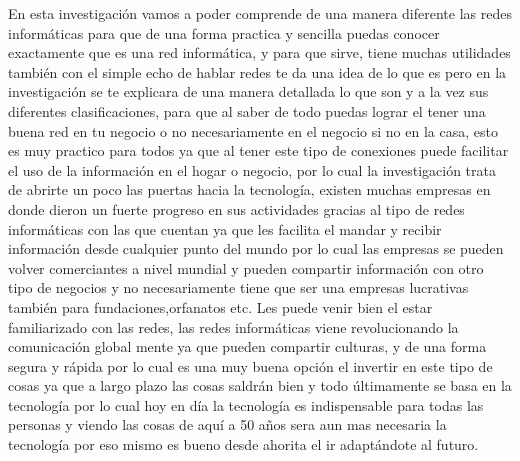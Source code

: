 \documentclass{bmcart}
\begin{document}
En esta investigación vamos a poder comprende de una manera diferente las redes informáticas para que de una forma practica y sencilla puedas conocer exactamente que es una red informática, y para que sirve, tiene muchas utilidades también con el simple echo de hablar redes te da una idea de lo que es pero en la investigación se te explicara de una manera detallada lo que son y a la vez sus diferentes clasificaciones, para que al saber de todo puedas lograr el tener una buena red en tu negocio o no necesariamente en el negocio si no en la casa, esto es muy practico para todos ya que al tener este tipo de conexiones puede facilitar el uso de la información en el hogar o negocio, por lo cual la investigación trata de abrirte un poco las puertas hacia la tecnología, existen muchas empresas en donde dieron un fuerte progreso en sus actividades gracias al tipo de redes informáticas con las que cuentan ya que les facilita el mandar y recibir información desde cualquier punto del mundo por lo cual las empresas se pueden volver comerciantes a nivel mundial y pueden compartir información con otro tipo de negocios y no necesariamente tiene que ser una empresas lucrativas también para fundaciones,orfanatos etc. Les puede venir bien el estar familiarizado con las redes, las redes informáticas viene revolucionando la comunicación global mente ya que pueden compartir culturas, y de una forma segura y rápida por lo cual es una muy buena opción el invertir en este tipo de cosas ya que a largo plazo las cosas saldrán bien y todo últimamente se basa en la tecnología por lo cual hoy en día la tecnología es indispensable para todas las personas y viendo las cosas de aquí a 50 años sera aun mas necesaria la tecnología por eso mismo es bueno desde ahorita el ir adaptándote al futuro. 
\end{document}
